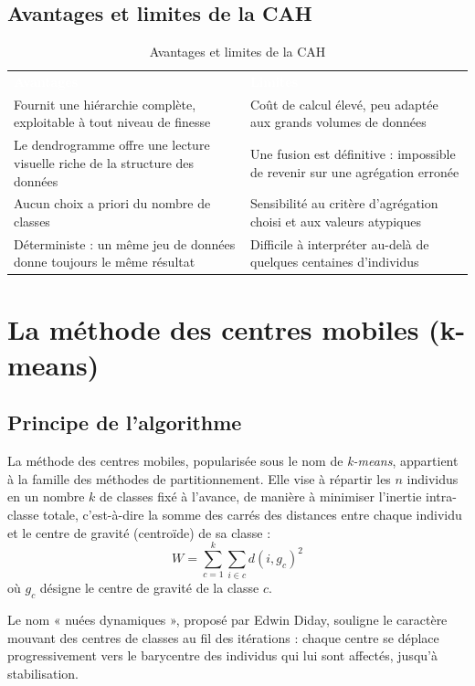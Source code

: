 \documentclass[11pt,a4paper]{report}
\begin{document}
	\section{Avantages et limites de la CAH}
	
	\begin{table}[h]
		\centering
		\small
		\begin{tabularx}{\textwidth}{X X}
			\rowcolor{navy}
			\textcolor{white}{\bfseries Avantages} & \textcolor{white}{\bfseries Limites} \\
			Fournit une hiérarchie complète, exploitable à tout niveau de finesse & Coût de calcul élevé, peu adaptée aux grands volumes de données \\
			Le dendrogramme offre une lecture visuelle riche de la structure des données & Une fusion est définitive : impossible de revenir sur une agrégation erronée \\
			Aucun choix a priori du nombre de classes & Sensibilité au critère d'agrégation choisi et aux valeurs atypiques \\
			Déterministe : un même jeu de données donne toujours le même résultat & Difficile à interpréter au-delà de quelques centaines d'individus \\
		\end{tabularx}
		\caption{Avantages et limites de la CAH}
	\end{table}
	
	\chapter{La méthode des centres mobiles (k-means)}
	
	\section{Principe de l'algorithme}
	
	La méthode des centres mobiles, popularisée sous le nom de \emph{k-means}, appartient à la famille des méthodes de partitionnement. Elle vise à répartir les $n$ individus en un nombre $k$ de classes fixé à l'avance, de manière à minimiser l'inertie intra-classe totale, c'est-à-dire la somme des carrés des distances entre chaque individu et le centre de gravité (centroïde) de sa classe :
	\[
	W = \sum_{c=1}^{k} \sum_{i \in c} d(i, g_c)^2
	\]
	où $g_c$ désigne le centre de gravité de la classe $c$.
	
	Le nom « nuées dynamiques », proposé par Edwin Diday, souligne le caractère mouvant des centres de classes au fil des itérations : chaque centre se déplace progressivement vers le barycentre des individus qui lui sont affectés, jusqu'à stabilisation.
	
\end{document}
